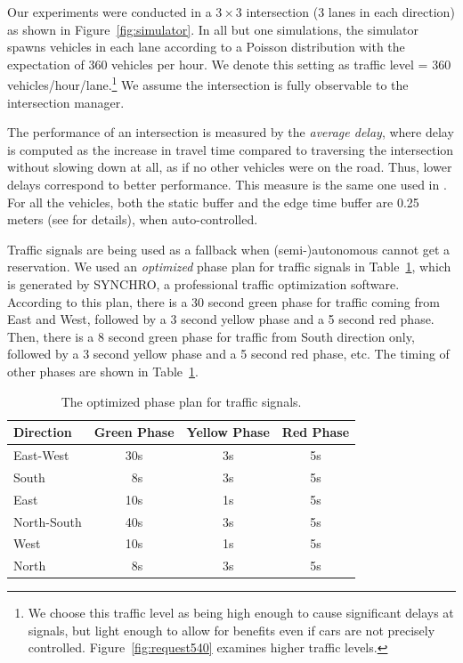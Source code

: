 Our experiments were conducted in a $3 \times 3$ intersection (3 lanes
in each direction) as shown in Figure~\ref{fig:simulator}.  In all but
one simulations, the simulator spawns vehicles in each lane according
to a Poisson distribution with the expectation of 360 vehicles per
hour.  We denote this setting as traffic level = 360
vehicles/hour/lane.\footnote{We choose this traffic level as being
high enough to cause significant delays at signals, but light enough
to allow for benefits even if cars are not precisely
controlled. Figure~\ref{fig:request540} examines higher traffic
levels.} We assume the intersection is fully observable to the
intersection manager.

The performance of an intersection is measured by the \emph{average
delay}, where delay is computed as the increase in travel time
compared to traversing the intersection without slowing down at all,
as if no other vehicles were on the road. Thus, lower delays
correspond to better performance.  This measure is the same one used
in \cite{bib:Dresner08Multiagent}. For all the vehicles, both the
static buffer and the edge time buffer are 0.25 meters (see
\cite{bib:Dresner08Multiagent} for details), when auto-controlled.

Traffic signals are being used as a fallback when (semi-)autonomous
cannot get a reservation.  We used an \emph{optimized} phase plan for
traffic signals in Table~\ref{table:phase}, which is generated by
SYNCHRO, a professional traffic optimization software.  According to
this plan, there is a 30 second green phase for traffic coming from
East and West, followed by a 3 second yellow phase and a 5 second red
phase.  Then, there is a 8 second green phase for traffic from South
direction only, followed by a 3 second yellow phase and a 5 second red
phase, etc.  The timing of other phases are shown in
Table~\ref{table:phase}.

\begin{table}
\caption{The optimized phase plan for traffic signals.}
\label{table:phase}
\centering
\small
\begin{tabular}{|l|c|c|c|}
\hline
Direction & Green Phase & Yellow Phase & Red Phase \\
\hline
  East-West & 30s & 3s & 5s \\
  South & \ 8s & 3s & 5s \\
  East & 10s & 1s & 5s \\
  North-South & 40s & 3s & 5s \\
  West & 10s & 1s & 5s \\
  North & \ 8s & 3s & 5s \\
\hline
\end{tabular}
\end{table}

